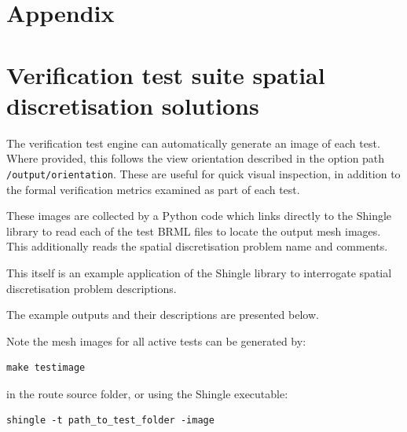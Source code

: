 \documentclass[a4paper, 10pt]{book}
\providecommand{\shingle}{Shingle\xspace}
\providecommand{\brml}{BRML\xspace}
\begin{document}
\chapter{Appendix}




\chapter{Verification test suite spatial discretisation solutions}

The verification test engine can automatically generate an image of each test.
Where provided, this follows the view orientation described in the option path \verb+/output/orientation+.
These are useful for quick visual inspection, in addition to the formal verification metrics examined as part of each test.

These images are collected by a Python code which links directly to the \shingle library to read each of 
the test \brml files to locate the output mesh images.
This additionally reads the spatial discretisation problem name and comments.

This itself is an example application of the \shingle library to interrogate spatial discretisation problem descriptions.

The example outputs and their descriptions are presented below.

\noindent
Note the mesh images for all active tests can be generated by:
\begin{verbatim}
make testimage
\end{verbatim}
in the route source folder, or using the \shingle executable:
\begin{verbatim}
shingle -t path_to_test_folder -image
\end{verbatim}






\cleardoublepage

\end{document}
